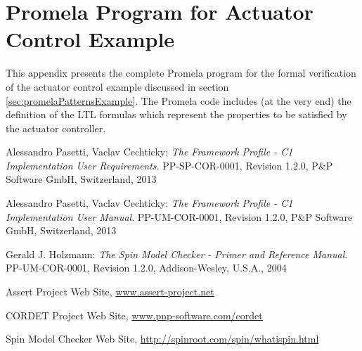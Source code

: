 \documentclass[a4paper,10pt]{article}
\let\stdsection\section
\renewcommand\section{\newpage\stdsection}
\begin{document}
\begin{landscape}

\end{landscape}

\section{Promela Program for Actuator Control Example}\label{sec:promelaProgForActExample}
This appendix presents the complete Promela program for the formal verification of the actuator control example discussed in section \ref{sec:promelaPatternsExample}. The Promela code includes (at the very end) the definition of the LTL formulas which represent the properties to be satisfied by the actuator controller.   

\begin{landscape}

\end{landscape}



\begin{thebibliography}{6}

 Alessandro Pasetti, Vaclav Cechticky:
           {\sl The Framework Profile - C1 Implementation User Requirements}. PP-SP-COR-0001, Revision 1.2.0,
           P\&P Software GmbH, Switzerland, 2013

 Alessandro Pasetti, Vaclav Cechticky:
            {\sl The Framework Profile - C1 Implementation User Manual}. PP-UM-COR-0001, Revision 1.2.0,
            P\&P Software GmbH, Switzerland, 2013 

 Gerald J. Holzmann:
            {\sl The Spin Model Checker - Primer and Reference Manual}. PP-UM-COR-0001, Revision 1.2.0,
            Addison-Wesley, U.S.A., 2004 

 Assert Project Web Site, \url{www.assert-project.net}

 CORDET Project Web Site, \url{www.pnp-software.com/cordet}

 Spin Model Checker Web Site, \url{http://spinroot.com/spin/whatispin.html}

\end{thebibliography}
\end{document}
